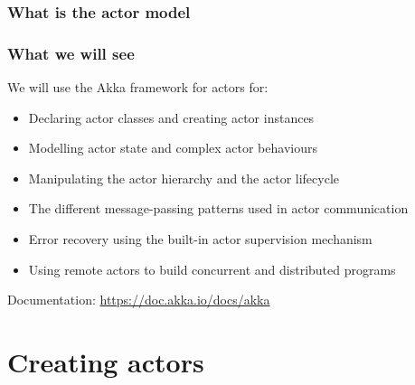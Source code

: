 \documentclass[aspectratio=169]{beamer}
\begin{document}
\begin{frame}\frametitle{What is the actor model}
\end{frame}

\begin{frame}[t]\frametitle{What we will see}

  We will use the Akka framework for actors for:
  \begin{itemize}
    \item Declaring \alert{actor classes} and creating \alert{actor instances}
    \item Modelling \alert{actor state} and complex \alert{actor behaviours}
    \item Manipulating the \alert{actor hierarchy} and the \alert{actor lifecycle}
    \item The different message-passing patterns used in \alert{actor communication}
    \item Error recovery using the built-in \alert{actor supervision} mechanism
    \item Using \alert{remote actors} to build concurrent and distributed programs
  \end{itemize}

  Documentation: \url{https://doc.akka.io/docs/akka}


\end{frame}


\section{Creating actors}
\end{document}
